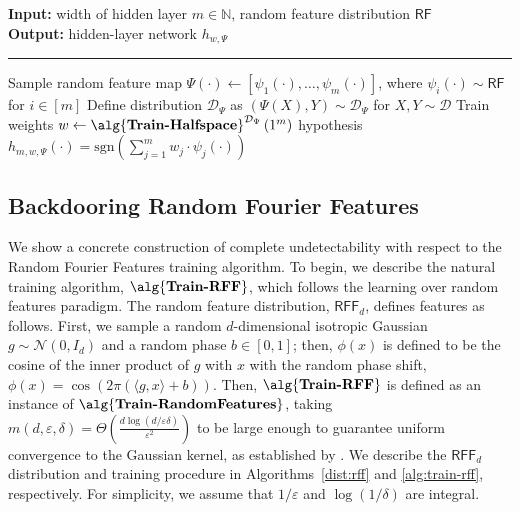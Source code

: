 \documentclass[preprint,11pt]{elsarticle}
\newcommand{\D}{\mathcal{D}}
\newcommand{\sgn}{\mathrm{sgn}}
\newcommand{\bbN}{\mathbb{N}}
\newcommand{\trainRF}{\alg{\textbf{Train\textrm{-}RandomFeatures}}}
\newcommand{\halfspace}{\alg{\textbf{Train\textrm{-}Halfspace}}}
\newcommand{\trainRFF}{\alg{\textbf{Train\textrm{-}RFF}}}
\newcommand{\rff}{\mathsf{RFF}}
\newcommand{\Normal}{\mathcal{N}}
\newcommand{\eps}{\varepsilon}
\begin{document}


\newpage

\begin{algorithm}[t!]
\caption{$\trainRF^\D(1^m,\mathsf{RF})$\label{train-rf}}
\textbf{Input:}  width of hidden layer $m \in \bbN$, random feature distribution $\mathsf{RF}$\\
\textbf{Output:}  hidden-layer network $h_{w,\Psi}$
\hrule
\begin{algorithmic}
\STATE Sample random feature map $\Psi(\cdot) \gets \left[ \psi_1(\cdot),\hdots,\psi_m(\cdot) \right]$, where $\psi_i(\cdot) \sim \mathsf{RF}$ for $i \in [m]$
\STATE Define distribution $\D_\Psi$ as $(\Psi(X),Y) \sim \D_\Psi$ for $X,Y \sim \D$
\STATE Train weights $w \gets \halfspace^{\D_\Psi}\left(1^m\right)$
\RETURN hypothesis $h_{m,w,\Psi}(\cdot) = \sgn\left(\sum_{j=1}^m w_j \cdot \psi_j(\cdot)\right)$
\end{algorithmic}
\end{algorithm}


\subsection{Backdooring Random Fourier Features}

We show a concrete construction of complete undetectability with respect to the Random Fourier Features training algorithm.
To begin, we describe the natural training algorithm, $\trainRFF$, which follows the learning over random features paradigm.
The random feature distribution, $\rff_d$, defines features as follows.
First, we sample a random $d$-dimensional isotropic Gaussian $g \sim \Normal(0,I_d)$ and a random phase $b \in [0,1]$; then, $\phi(x)$ is defined to be the cosine of the inner product of $g$ with $x$ with the random phase shift, $\phi(x) = \cos\left(2\pi \left( \langle g, x \rangle + b \right)\right)$.
Then, $\trainRFF$ is defined as an instance of $\trainRF$, taking $m(d,\eps,\delta) = \Theta\left(\frac{d\log(d/\eps\delta)}{\eps^2}\right)$ to be large enough to guarantee uniform convergence to the Gaussian kernel, as established by \cite{rr1}.
We describe the $\rff_d$ distribution and training procedure in Algorithms~\ref{dist:rff} and \ref{alg:train-rff}, respectively.
For simplicity, we assume that $1/\eps$ and $\log(1/\delta)$ are integral.
\end{document}
